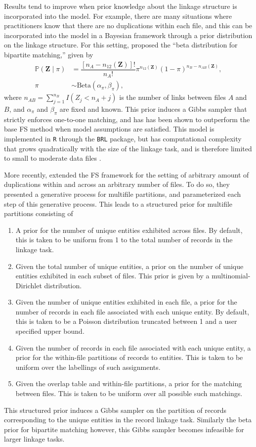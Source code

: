 \documentclass[12pt,letterpaper]{article}
\newcommand{\1}[1]{\mathbb{I}\!\left[#1\right]} %
\begin{document}
Results tend to improve when prior knowledge about the linkage structure is incorporated into the model. For example, there are many situations where practitioners know that there are no duplications within each file, and this can be incorporated into the model in a Bayesian framework through a prior distribution on the linkage structure. For this setting, \cite{sadinle_bayesian_2017} proposed the ``beta distribution for bipartite matching,'' given by
\begin{align}
	\mathbb{P}(\bm{Z}\mid \pi) &=\dfrac{[n_A-n_{12}(\bm{Z})]!}{n_A!} %
	\pi^{n_{12}(\bm{Z})}(1-\pi)^{n_B-n_{AB}(\bm{Z})},  	\label{eq:brlprior}\\
	\pi &\sim \text{Beta}(\alpha_{\pi}, \beta_{\pi}),
\end{align}
where $n_{AB} = \sum_{j=1}^{n_B} I(Z_j < n_A + j)$ is the number of links between files $A$ and $B$, and $\alpha_{\pi}$ and $\beta_{\pi}$ are fixed and known. This prior induces a Gibbs sampler that strictly enforces one-to-one matching, and has has been shown to outperform the base FS method when model assumptions are satisfied. This model is implemented in \texttt{R} through the \texttt{BRL} package, but has computational complexity that grows quadratically with the size of the linkage task, and is therefore limited to small to moderate data files \citep{BRL}.

More recently, \cite{aleshin2023multifile} extended the FS framework for the setting of arbitrary amount of duplications within and across an arbitrary number of files. To do so, they presented a generative process for multifile partitions, and parameterized each step of this generative process. This leads to a structured prior for multifile partitions consisting of
\begin{enumerate}
	\item A prior for the number of unique entities exhibited across files. By default, this is taken to be uniform from 1 to the total number of records in the linkage task.
	\item Given the total number of unique entities, a prior on the number of unique entities exhibited in each subset of files. This prior is given by a multinomial-Dirichlet distribution.
	\item Given the number of unique entities exhibited in each file, a prior for the number of records in each file associated with each unique entity. By default, this is taken to be a Poisson distribution truncated between 1 and a user specified upper bound.
	\item Given the number of records in each file associated with each unique entity, a prior for the within-file partitions of records to entities. This is taken to be uniform over the labellings of such assignments.
	\item Given the overlap table and within-file partitions, a prior for the matching between files. This is taken to be uniform over all possible such matchings. 
\end{enumerate}
This structured prior induces a Gibbs sampler on the partition of records corresponding to the unique entities in the record linkage task. Similarly the beta prior for bipartite matching however, this Gibbs sampler becomes infeasible for larger linkage tasks. 
\end{document}
